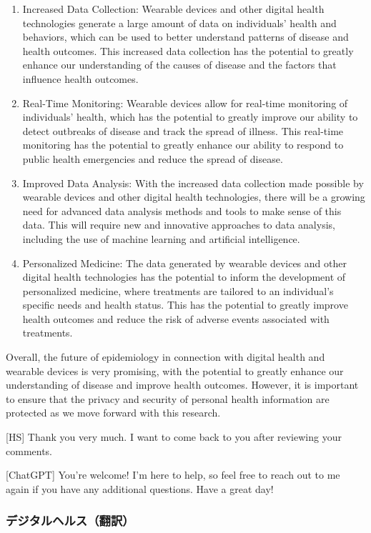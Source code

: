 \documentclass[
]{bxjsbook}
\providecommand{\tightlist}{%
  \setlength{\itemsep}{0pt}\setlength{\parskip}{0pt}}
\theoremstyle{definition}
\theoremstyle{definition}
\theoremstyle{definition}
\theoremstyle{definition}
\theoremstyle{remark}
\begin{document}
\begin{enumerate}
\def\labelenumi{\arabic{enumi}.}
\tightlist
\item
  Increased Data Collection: Wearable devices and other digital health technologies generate a large amount of data on individuals' health and behaviors, which can be used to better understand patterns of disease and health outcomes. This increased data collection has the potential to greatly enhance our understanding of the causes of disease and the factors that influence health outcomes.
\item
  Real-Time Monitoring: Wearable devices allow for real-time monitoring of individuals' health, which has the potential to greatly improve our ability to detect outbreaks of disease and track the spread of illness. This real-time monitoring has the potential to greatly enhance our ability to respond to public health emergencies and reduce the spread of disease.
\item
  Improved Data Analysis: With the increased data collection made possible by wearable devices and other digital health technologies, there will be a growing need for advanced data analysis methods and tools to make sense of this data. This will require new and innovative approaches to data analysis, including the use of machine learning and artificial intelligence.
\item
  Personalized Medicine: The data generated by wearable devices and other digital health technologies has the potential to inform the development of personalized medicine, where treatments are tailored to an individual's specific needs and health status. This has the potential to greatly improve health outcomes and reduce the risk of adverse events associated with treatments.
\end{enumerate}

Overall, the future of epidemiology in connection with digital health and wearable devices is very promising, with the potential to greatly enhance our understanding of disease and improve health outcomes. However, it is important to ensure that the privacy and security of personal health information are protected as we move forward with this research.

{[}HS{]} Thank you very much. I want to come back to you after reviewing your comments.

{[}ChatGPT{]} You're welcome! I'm here to help, so feel free to reach out to me again if you have any additional questions. Have a great day!

\hypertarget{digitalhealthj}{%
\subsubsection{デジタルヘルス（翻訳）}\label{digitalhealthj}}
\end{document}
